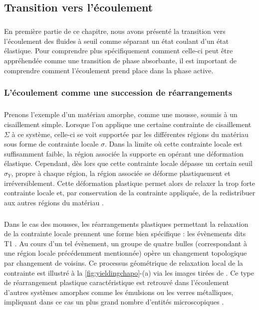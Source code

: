 \subsection{Transition vers l'écoulement}

\label{sec:yieldingCDP}

\subparagraph{}En première partie de ce chapitre, nous avons présenté la transition vers l'écoulement des fluides à seuil comme séparant un état coulant d'un état élastique. Pour comprendre plus spécifiquement comment celle-ci peut être appréhendée comme une transition de phase absorbante, il est important de comprendre comment l'écoulement prend place dans la phase active.

\subsubsection{L'écoulement comme une succession de réarrangements}

\subparagraph{}Prenons l'exemple d'un matériau amorphe, comme une mousse, soumis à un cisaillement simple. Lorsque l'on applique une certaine contrainte de cisaillement $\Sigma$ à ce système, celle-ci se voit supportée par les différentes régions du matériau sous forme de contrainte locale $\sigma$. Dans la limite où cette contrainte locale est suffisamment faible, la région associée la supporte en opérant une déformation élastique. Cependant, dès lors que cette contrainte locale dépasse un certain seuil $\sigma_Y$, propre à chaque région, la région associée se déforme plastiquement et irréversiblement. Cette déformation plastique permet alors de relaxer la trop forte contrainte locale et, par conservation de la contrainte appliquée, de la redistribuer aux autres régions du matériau \cite{nicolas_deformation_2018}. 

\subparagraph{}Dans le cas des mousses, les réarrangements plastiques permettant la relaxation de la contrainte locale prennent une forme bien spécifique : les évènements dits T1 \cite{princen_rheology_1986}. Au cours d'un tel évènement, un groupe de quatre bulles (correspondant à une région locale précédemment mentionnée) opère un changement topologique par changement de voisins. Ce processus géométrique de relaxation local de la contrainte est illustré à la \autoref{fig:yieldingchapo}-(a) via les images tirées de \cite{dollet_rheology_2014}. Ce type de réarrangement plastique caractéristique est retrouvé dans l'écoulement d'autres systèmes amorphes comme les émulsions ou les verres métalliques, impliquant dans ce cas un plus grand nombre d'entités microscopiques \cite{nicolas_deformation_2018}. 

